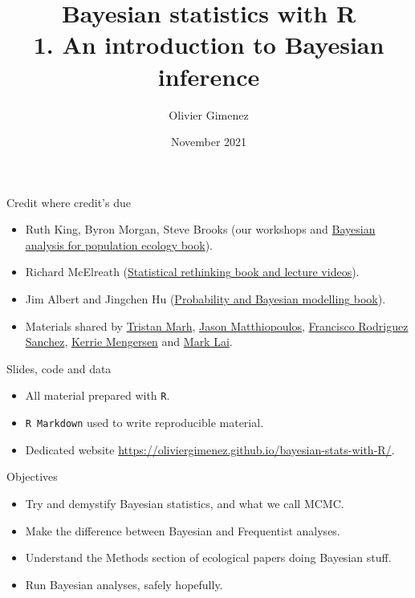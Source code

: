 \documentclass[
  ignorenonframetext,
  aspectratio=169]{beamer}
\title{Bayesian statistics with R\\
1. An introduction to Bayesian inference}
\author{Olivier Gimenez}
\date{November 2021}
\providecommand{\tightlist}{%
  \setlength{\itemsep}{0pt}\setlength{\parskip}{0pt}}
\begin{document}
\frame{\titlepage}

\begin{frame}{Credit where credit's due}
\protect\hypertarget{credit-where-credits-due}{}
\begin{itemize}
\item
  Ruth King, Byron Morgan, Steve Brooks (our workshops and
  \href{https://www.maths.ed.ac.uk/~rking33/Book-website/index.html}{\alert{Bayesian analysis for population ecology}
  book}).
\item
  Richard McElreath
  (\href{https://github.com/rmcelreath/statrethinking_winter2019}{\alert{Statistical rethinking}
  book and lecture videos}).
\item
  Jim Albert and Jingchen Hu
  (\href{https://bayesball.github.io/BOOK/probability-a-measurement-of-uncertainty.html}{\alert{Probability and Bayesian modelling}
  book}).
\item
  Materials shared by
  \href{https://www.tjmahr.com/}{\alert{Tristan Marh}},
  \href{https://www.gla.ac.uk/researchinstitutes/bahcm/staff/jasonmatthiopoulos/}{\alert{Jason Matthiopoulos}},
  \href{https://frodriguezsanchez.net/}{\alert{Francisco Rodriguez Sanchez}},
  \href{https://staff.qut.edu.au/staff/k.mengersen}{\alert{Kerrie Mengersen}}
  and \href{https://quantscience.rbind.io/}{\alert{Mark Lai}}.
\end{itemize}
\end{frame}

\begin{frame}[fragile]{Slides, code and data}
\protect\hypertarget{slides-code-and-data}{}
\begin{itemize}
\tightlist
\item
  All material prepared with \texttt{R}.
\item
  \texttt{R\ Markdown} used to write reproducible material.
\item
  Dedicated website
  \href{https://oliviergimenez.github.io/bayesian-stats-with-R/}{\alert{https://oliviergimenez.github.io/bayesian-stats-with-R/}}.
\end{itemize}
\end{frame}

\begin{frame}{Objectives}
\protect\hypertarget{objectives}{}
\begin{itemize}
\tightlist
\item
  Try and demystify Bayesian statistics, and what we call MCMC.
\item
  Make the difference between Bayesian and Frequentist analyses.
\item
  Understand the Methods section of ecological papers doing Bayesian
  stuff.
\item
  Run Bayesian analyses, safely hopefully.
\end{itemize}
\end{frame}
\end{document}
